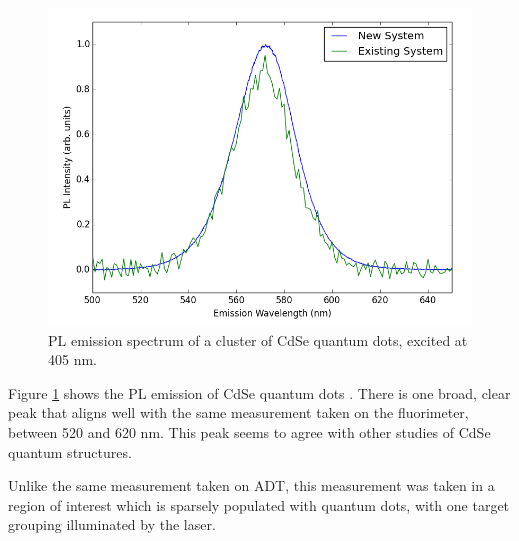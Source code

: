 \begin{figure}[H]
    \centering
    \includegraphics[width=\textwidth]{./img/qd-2.png}
    \caption{PL emission spectrum of a cluster of CdSe quantum dots, excited at 405 nm.}
    \label{fig:pl-adt-qd}
\end{figure}

Figure \ref{fig:pl-adt-qd} shows the PL emission of CdSe quantum dots . There is one broad, clear peak that aligns well with the same measurement taken on the fluorimeter, between 520 and 620 nm. This peak seems to agree with other studies of CdSe quantum structures.\cite{empedocles_photoluminescence_1996}

Unlike the same measurement taken on ADT, this measurement was taken in a region of interest which is sparsely populated with quantum dots, with one target grouping illuminated by the laser.

